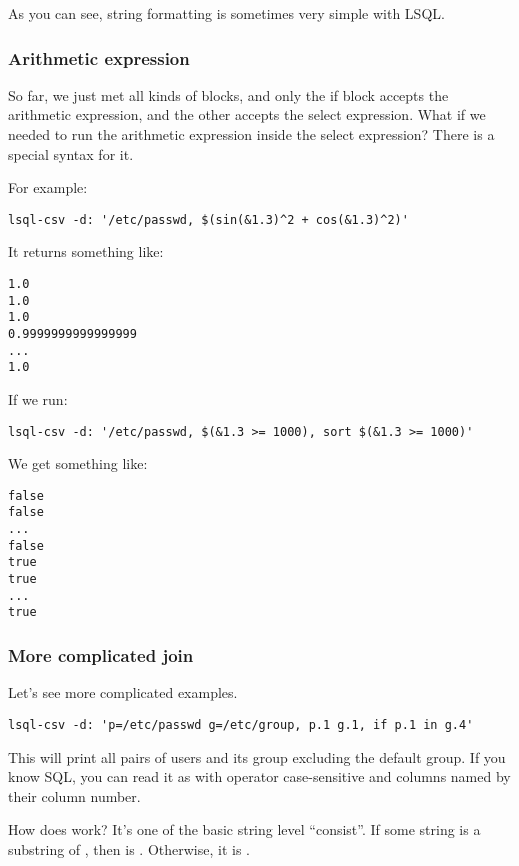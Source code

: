 As you can see, string formatting is sometimes very simple with LSQL.

\subsubsection{Arithmetic expression}
So far, we just met all kinds of blocks, and only the if block accepts the arithmetic expression, and the other accepts the select expression.
What if we needed to run the arithmetic expression inside the select expression? There is a special syntax \icode{\$(\ldots{})} for it.

For example:
\begin{verbatim}
lsql-csv -d: '/etc/passwd, $(sin(&1.3)^2 + cos(&1.3)^2)'
\end{verbatim}

It returns something like:
\begin{verbatim}
1.0
1.0
1.0
0.9999999999999999
...
1.0
\end{verbatim}

If we run:
\begin{verbatim}
lsql-csv -d: '/etc/passwd, $(&1.3 >= 1000), sort $(&1.3 >= 1000)'
\end{verbatim}

We get something like:
\begin{verbatim}
false
false
...
false
true
true
...
true
\end{verbatim}

\subsubsection{More complicated join}
Let's see more complicated examples.
\begin{verbatim}
lsql-csv -d: 'p=/etc/passwd g=/etc/group, p.1 g.1, if p.1 in g.4'
\end{verbatim}
This will print all pairs of users and its group excluding the default group. 
If you know SQL, you can read it as  with operator  case-sensitive and columns named by their column number.

How does  work? It's one of the basic string level ``consist''. If some string  is a substring of , then  is . Otherwise, it is .


